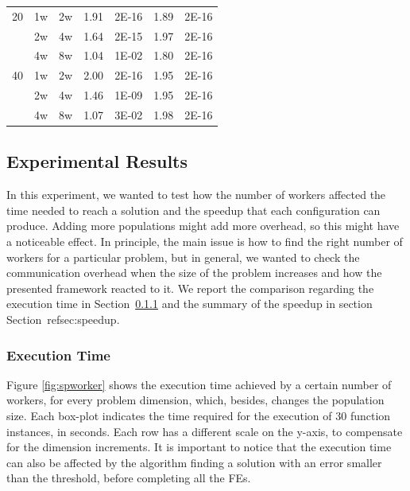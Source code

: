 \documentclass[review]{elsarticle}
\begin{document}
\begin{table}[h!tbp]
\begin{tabular}{lllllll}
  20        & 1w            & 2w            & 1.91            & 2E-16           & 1.89             & 2E-16           \\
            & 2w            & 4w            & 1.64            & 2E-15           & 1.97             & 2E-16           \\
            & 4w            & 8w            & 1.04            & 1E-02           & 1.80             & 2E-16           \\
  40        & 1w            & 2w            & 2.00            & 2E-16           & 1.95             & 2E-16           \\
            & 2w            & 4w            & 1.46            & 1E-09           & 1.95             & 2E-16           \\
            & 4w            & 8w            & 1.07            & 3E-02           & 1.98             & 2E-16          
  \end{tabular}
  \end{table}

\subsection{Experimental Results} 
\label{results}

In this experiment, we wanted to test how the number of workers affected the
time needed to reach a solution and the speedup that each configuration can
produce. Adding more populations might add more overhead, so this might have a
noticeable effect. In principle, the main issue is how to find the right number
of workers for a particular problem, but in general, we wanted to check the
communication overhead when the size of the problem increases and how the
presented framework reacted to it.    %
We report the comparison regarding the execution time in Section~\ref{sec:exec-time}
and the summary of the speedup in section Section~ref{sec:speedup}.

\subsubsection{Execution Time}
\label{sec:exec-time}

Figure \ref{fig:spworker} shows the execution time achieved by a certain number of
workers, for every problem dimension, which, besides, changes the
population size.
Each box-plot indicates the time required for the execution of 30 function
instances, in seconds. Each row has a different scale on the y-axis, to
compensate for the dimension increments. It is important to notice that the
execution time can also be affected by the algorithm finding a solution with an
error smaller than the threshold, before completing all the FEs. 
\end{document}
